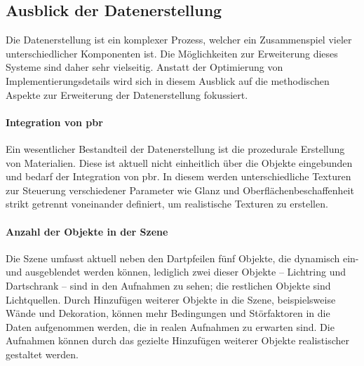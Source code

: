 
\vspace*{-0.15cm}
\subsection{Ausblick der Datenerstellung}
\label{sec:ausblick_data}

Die Datenerstellung ist ein komplexer Prozess, welcher ein Zusammenspiel vieler unterschiedlicher Komponenten ist. Die Möglichkeiten zur Erweiterung dieses Systeme sind daher sehr vielseitig. Anstatt der Optimierung von Implementierungsdetails wird sich in diesem Ausblick auf die methodischen Aspekte zur Erweiterung der Datenerstellung fokussiert.

\vspace*{-0.15cm}
\paragraph{Integration von \ac{pbr}}

Ein wesentlicher Bestandteil der Datenerstellung ist die prozedurale Erstellung von Materialien. Diese ist aktuell nicht einheitlich über die Objekte eingebunden und bedarf der Integration von \ac{pbr}. In diesem werden unterschiedliche Texturen zur Steuerung verschiedener Parameter wie Glanz und Oberflächenbeschaffenheit strikt getrennt voneinander definiert, um realistische Texturen zu erstellen.


\vspace*{-0.15cm}
\paragraph{Anzahl der Objekte in der Szene}

Die Szene umfasst aktuell neben den Dartpfeilen fünf Objekte, die dynamisch ein- und ausgeblendet werden können, lediglich zwei dieser Objekte -- Lichtring und Dartschrank -- sind in den Aufnahmen zu sehen; die restlichen Objekte sind Lichtquellen. Durch Hinzufügen weiterer Objekte in die Szene, beispielsweise Wände und Dekoration, können mehr Bedingungen und Störfaktoren in die Daten aufgenommen werden, die in realen Aufnahmen zu erwarten sind. Die Aufnahmen können durch das gezielte Hinzufügen weiterer Objekte realistischer gestaltet werden.


